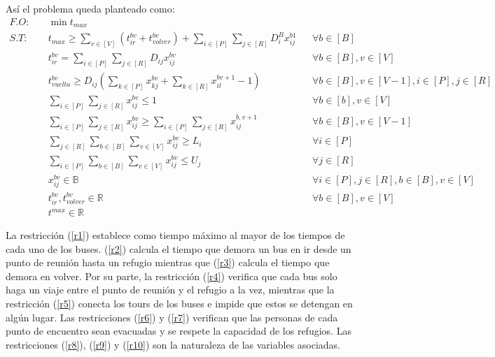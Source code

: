 \documentclass[letter, 10pt]{article}
\begin{document}
    Así el problema queda planteado como:
    \newcommand{\qweq}{\sum_{i\in [P]} \sum_{j\in [R]}}
    \newcommand{\asda}{x^{bv}_{ij}}
    \begin{align}
        F.O:\quad&\min t_{max} \nonumber \\
        S.T:\quad& t_{max} \geq \sum_{v\in [V]}(t^{bv}_{ir} + t^{bv}_{volver})
        + \qweq D_i^Bx^{b1}_{ij} && \forall b\in [B]
        \label{r1} \\
        & t^{bv}_{ir} = \qweq D_{ij}\asda && \forall b\in [B], v\in [V]
        \label{r2} \\
        & t^{bv}_{vuelta} \geq D_{ij}( \sum_{k\in [P]}x^{bv}_{kj} + \sum_{k\in
        [R]} x^{bv+1}_{il} - 1) && \forall b\in [B], v\in [V-1], i\in [P],
         j\in [R] \label{r3} \\
        & \qweq \asda \leq 1 && \forall b\in [b], v\in [V] \label{r4}\\
        & \qweq \asda \geq \qweq x^{b,v+1}_{ij} && \forall b\in [B], v\in[V-1]
        \label{r5} \\
        & \sum_{j\in[R]}\sum_{b\in[B]}\sum_{v\in[V]} \asda \geq L_i && \forall
        i\in[P] \label{r6}\\
        & \sum_{i\in[P]}\sum_{b\in[B]}\sum_{v\in[V]} \asda \leq U_j && \forall
        j\in[R] \label{r7}\\
        &\asda \in \mathbb{B}&& \forall i\in[P],j\in[R],b\in[B],v\in[V]
        \label{r8} \\
        & t^{bv}_{ir}, t^{bv}_{volver}\in \mathbb{R}&&\forall b\in[B],v\in[V]
        \label{r9} \\
        & t^{max} \in \mathbb{R} \label{r10}
    \end{align}

    La restricción (\ref{r1}) establece como tiempo máximo al mayor de los 
    tiempos de cada uno de los buses. (\ref{r2}) calcula el tiempo que demora
    un bus en ir desde un punto de reunión hasta un refugio mientras que
    (\ref{r3}) calcula el tiempo que demora en volver. Por su parte, la
    restricción (\ref{r4}) verifica que cada bus solo haga un viaje entre el
    punto de reunión y el refugio a la vez, mientras que la restricción
    (\ref{r5}) conecta los tours de los buses e impide que estos se detengan
    en algún lugar. Las restricciones (\ref{r6}) y (\ref{r7}) verifican que las
    personas de cada punto de encuentro sean evacuadas y se respete la capacidad
    de los refugios. Las restricciones (\ref{r8}), (\ref{r9}) y (\ref{r10}) son
    la naturaleza de las variables asociadas.
\end{document}
